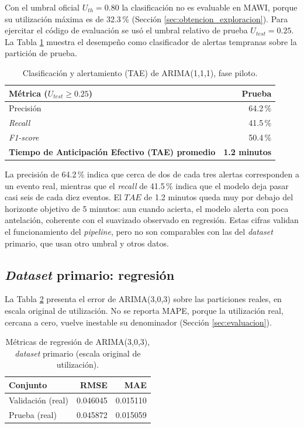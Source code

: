 \documentclass[12pt]{report}
\begin{document}
Con el umbral oficial $U_{th}=0.80$ la clasificación no es evaluable en MAWI, porque su utilización máxima es de 32.3\,\% (Sección \ref{sec:obtencion_exploracion}). Para ejercitar el código de evaluación se usó el umbral relativo de prueba $U_{test}=0.25$. La Tabla \ref{tab:resultados_arima_clasificacion} muestra el desempeño como clasificador de alertas tempranas sobre la partición de prueba.

\begin{table}[H]
    \centering
    \begin{tabular}{|l|r|}
        \hline
        \textbf{Métrica ($U_{test} \geq 0.25$)} & \textbf{Prueba} \\
        \hline
        Precisión & 64.2\,\% \\
        \textit{Recall} & 41.5\,\% \\
        \textit{F1-score} & 50.4\,\% \\
        \textbf{Tiempo de Anticipación Efectivo (TAE) promedio} & \textbf{1.2 minutos} \\
        \hline
    \end{tabular}
    \caption{Clasificación y alertamiento (TAE) de ARIMA(1,1,1), fase piloto.}
    \label{tab:resultados_arima_clasificacion}
\end{table}

La precisión de 64.2\,\% indica que cerca de dos de cada tres alertas corresponden a un evento real, mientras que el \textit{recall} de 41.5\,\% indica que el modelo deja pasar casi seis de cada diez eventos. El $TAE$ de 1.2 minutos queda muy por debajo del horizonte objetivo de 5 minutos: aun cuando acierta, el modelo alerta con poca antelación, coherente con el suavizado observado en regresión. Estas cifras validan el funcionamiento del \textit{pipeline}, pero no son comparables con las del \textit{dataset} primario, que usan otro umbral y otros datos.

\subsection*{\textit{Dataset} primario: regresión}

La Tabla \ref{tab:arima_primario_regresion} presenta el error de ARIMA(3,0,3) sobre las particiones reales, en escala original de utilización. No se reporta MAPE, porque la utilización real, cercana a cero, vuelve inestable su denominador (Sección \ref{sec:evaluacion}).

\begin{table}[H]
    \centering
    \begin{tabular}{|l|r|r|}
        \hline
        \textbf{Conjunto} & \textbf{RMSE} & \textbf{MAE} \\
        \hline
        Validación (real) & 0.046045 & 0.015110 \\
        Prueba (real) & 0.045872 & 0.015059 \\
        \hline
    \end{tabular}
    \caption{Métricas de regresión de ARIMA(3,0,3), \textit{dataset} primario (escala original de utilización).}
    \label{tab:arima_primario_regresion}
\end{table}
\end{document}

